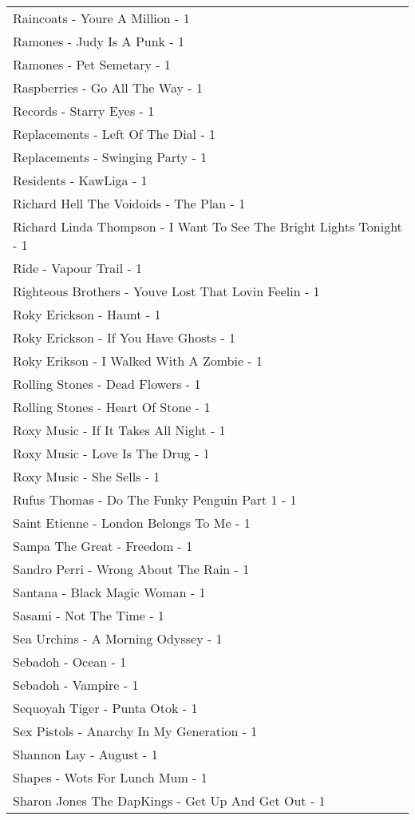 \documentclass[
]{article}
\begin{document}
\begin{longtable}{l}
Raincoats - Youre A Million - 1 \\ 
Ramones - Judy Is A Punk - 1 \\ 
Ramones - Pet Semetary - 1 \\ 
Raspberries - Go All The Way - 1 \\ 
Records - Starry Eyes - 1 \\ 
Replacements - Left Of The Dial - 1 \\ 
Replacements - Swinging Party - 1 \\ 
Residents - KawLiga - 1 \\ 
Richard Hell The Voidoids - The Plan - 1 \\ 
Richard Linda Thompson - I Want To See The Bright Lights Tonight - 1 \\ 
Ride - Vapour Trail - 1 \\ 
Righteous Brothers - Youve Lost That Lovin Feelin - 1 \\ 
Roky Erickson - Haunt - 1 \\ 
Roky Erickson - If You Have Ghosts - 1 \\ 
Roky Erikson - I Walked With A Zombie - 1 \\ 
Rolling Stones - Dead Flowers - 1 \\ 
Rolling Stones - Heart Of Stone - 1 \\ 
Roxy Music - If It Takes All Night - 1 \\ 
Roxy Music - Love Is The Drug - 1 \\ 
Roxy Music - She Sells - 1 \\ 
Rufus Thomas - Do The Funky Penguin Part 1 - 1 \\ 
Saint Etienne - London Belongs To Me - 1 \\ 
Sampa The Great - Freedom - 1 \\ 
Sandro Perri - Wrong About The Rain - 1 \\ 
Santana - Black Magic Woman - 1 \\ 
Sasami - Not The Time - 1 \\ 
Sea Urchins - A Morning Odyssey - 1 \\ 
Sebadoh - Ocean - 1 \\ 
Sebadoh - Vampire - 1 \\ 
Sequoyah Tiger - Punta Otok - 1 \\ 
Sex Pistols - Anarchy In My Generation - 1 \\ 
Shannon Lay - August - 1 \\ 
Shapes - Wots For Lunch Mum - 1 \\ 
Sharon Jones The DapKings - Get Up And Get Out - 1 \\ 

\end{longtable}
\end{document}
